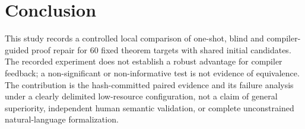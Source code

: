 \documentclass[runningheads,a4paper]{llncs}
\begin{document}
\section{Conclusion}
This study records a controlled local comparison of one-shot, blind and
compiler-guided proof repair for 60 fixed theorem targets with shared initial
candidates. The recorded experiment does not establish a robust advantage for compiler feedback; a non-significant or non-informative test is not evidence of equivalence. The contribution is the hash-committed paired evidence
and its failure analysis under a clearly delimited low-resource configuration,
not a claim of general superiority, independent human semantic validation, or
complete unconstrained natural-language formalization.



\end{document}
